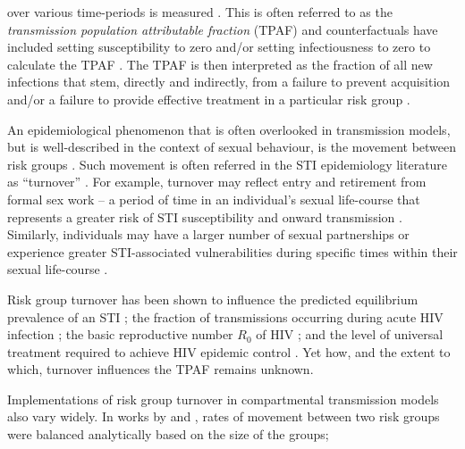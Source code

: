 over various time-periods is measured \citep{Mishra2016,Mukandavire2018}.
This is often referred to as the
\textit{transmission population attributable fraction} (TPAF) 
and counterfactuals have included
setting susceptibility to zero and/or setting 
infectiousness to zero to calculate the TPAF \citep{Mishra2012}.
The TPAF is then interpreted as
the fraction of all new infections that stem, directly and indirectly, from
a failure to prevent acquisition and/or
a failure to provide effective treatment in a particular risk group \citep{Mishra2016}.
\par
An epidemiological phenomenon that is often overlooked in transmission models,
but is well-described in the context of sexual behaviour,
is the movement between risk groups \citep{Watts2010}.
Such movement is often referred in the STI epidemiology literature as
``turnover'' \citep{Watts2010}.
For example, turnover may reflect entry and retirement from
formal sex work -- a period of time in an individual's sexual life-course
that represents a greater risk of STI susceptibility and 
onward transmission \citep{Watts2010}. Similarly, individuals 
may have a larger number of sexual partnerships or experience
greater STI-associated vulnerabilities during specific times
within their sexual life-course \citep{Marston2006}.
\par
Risk group turnover has been shown to 
influence the predicted equilibrium prevalence of an STI \citep{Stigum1994,Eaton2014};
the fraction of transmissions occurring during acute HIV infection \citep{Zhang2012};
the basic reproductive number $R_0$ of HIV \citep{Henry2015}; and
the level of universal treatment required to achieve HIV epidemic control \citep{Henry2015}.
Yet how, and the extent to which, turnover influences the TPAF remains unknown.
\par
Implementations of risk group turnover in compartmental transmission models also vary widely.
In works by \citeauthor{Koopman1997} and \citeauthor{Stigum1994},
rates of movement between two risk groups
were balanced analytically based on the size of the groups;
